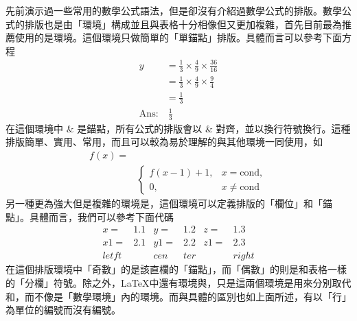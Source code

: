 \documentclass[12pt]{report}
\theoremstyle{plain}
\begin{document}
先前演示過一些常用的數學公式語法，但是卻沒有介紹過數學公式的排版。數學公式的排版也是由「環境」構成並且與表格十分相像但又更加複雜，首先目前最為推薦使用的是環境。這個環境只做簡單的「單錨點」排版。具體而言可以參考下面方程
\begin{equation}
    \begin{split}
        y &= \frac{1}{3}\times \frac{4}{9} \times \frac{36}{16}\\
          &= \frac{1}{3}\times \frac{4}{9} \times \frac{9}{4}\\
          &= \frac{1}{3}\\
    \text{Ans:}&\ \frac{1}{3}
    \end{split}
\end{equation}
在這個環境中 $\&$ 是錨點，所有公式的排版會以 $\&$ 對齊，並以換行符號換行。這種排版簡單、實用、常用，而且可以較為易於理解的與其他環境一同使用，如
\begin{equation}
    \begin{split}
        f(x) =& \\
    &\begin{cases}
        f(x-1)+1, &x=\mathrm{cond},\\
        0, &x\neq \mathrm{cond}
    \end{cases}
    \end{split}
\end{equation}
另一種更為強大但是複雜的環境是，這個環境可以定義排版的「欄位」和「錨點」。具體而言，我們可以參考下面代碼
\begin{equation}
\begin{aligned}
    x=&1.1 & y=&1.2 & z=&1.3\\
    x1=&2.1 & y1=&2.2 & z1=&2.3 \\
    letft& & cen&ter & &right
\end{aligned}
\end{equation}
在這個排版環境中「奇數」的\code{\&}是該直欄的「錨點」，而「偶數」的\code{\&}則是和表格一樣的「分欄」符號。除之外，\LaTeX 中還有環境與，只是這兩個環境是用來分別取代和\code{\showcmd{[}\showcmd{]}}，而不像是「數學環境」內的環境。而與具體的區別也如上面所述，有以「行」為單位的編號而沒有編號。
\end{document}
